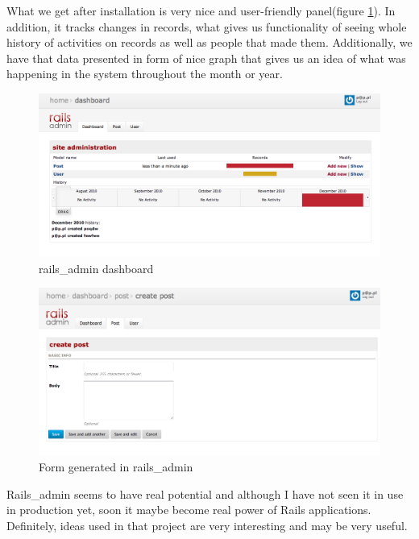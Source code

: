   What we get after installation is very nice and user-friendly panel(figure \ref{railsadmin1}). In addition, it tracks changes in records, what gives us functionality of seeing whole history of activities on records as well as people that made them. Additionally, we have that data presented in form of nice graph that gives us an idea of what was happening in the system throughout the month or year.
  
  
  \begin{figure}[hbt!]
		\begin{center}
			\includegraphics[width=\linewidth]{images/chapter01/railsadmin1.png}
			\caption{rails\_admin dashboard}
			\label{railsadmin1}
		\end{center}
	\end{figure}
	
	\begin{figure}[hbt!]
		\begin{center}
			\includegraphics[width=\linewidth]{images/chapter01/railsadmin2.png}
			\caption{Form generated in rails\_admin }
			\label{railsadmin2}
		\end{center}
	\end{figure}

  Rails\_admin seems to have real potential and although I have not seen it in use in production yet, soon it maybe become real power of Rails applications. Definitely, ideas used in that project are very interesting and may be very useful.